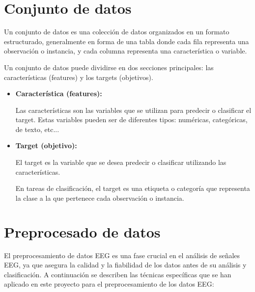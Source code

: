 \section{Conjunto de datos}

	Un conjunto de datos es una colección de datos organizados en un formato estructurado, generalmente en forma de una tabla donde cada fila representa una observación o instancia, y cada columna representa una característica o variable.
	
	Un conjunto de datos puede dividirse en dos secciones principales: las características (features) y los targets (objetivos).
	
	\begin{itemize}
	
	\item
	\textbf{Característica (features):}
	
	Las características son las variables que se utilizan para predecir o clasificar el target. 
	Estas variables pueden ser de diferentes tipos: numéricas, categóricas, de texto, etc... 
	
	\item
	\textbf{Target (objetivo):}
		
	El target es la variable que se desea predecir o clasificar utilizando las características. 
	
	En tareas de clasificación, el target es una etiqueta o categoría que representa la clase a la que pertenece cada observación o instancia.




	\end{itemize}	







\section{Preprocesado de datos}

	El preprocesamiento de datos EEG es una fase crucial en el análisis de señales EEG, ya que asegura la calidad y la fiabilidad de los datos antes de su análisis y clasificación. A continuación se describen las técnicas específicas que se han aplicado en este proyecto para el preprocesamiento de los datos EEG:

